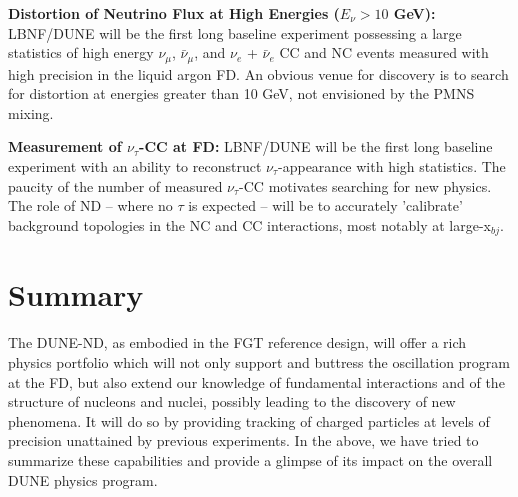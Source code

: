 \vspace{0.25cm} 
\noindent 
{\bf Distortion of Neutrino Flux at High Energies ($E_\nu > 10$ GeV):} 
LBNF/DUNE will be the first long baseline experiment possessing a large 
statistics of high energy $\nu_\mu$,  $\bar \nu_\mu$, and $\nu_e$ + $\bar \nu_e$ CC and NC events 
measured with high precision in the liquid argon FD. An obvious venue for discovery is to 
search for distortion at energies greater than 10 GeV, not envisioned by the 
PMNS mixing. 


\vspace{0.25cm} 
\noindent 
{\bf Measurement of $\nu_\tau$-CC at FD:} 
LBNF/DUNE will be the first long baseline experiment with an ability to 
reconstruct $\nu_\tau$-appearance with high statistics. The paucity of the number of measured 
$\nu_\tau$-CC motivates searching for new physics. 
The role of ND -- where no $\tau$ is expected -- will be to accurately 'calibrate' background topologies 
in the NC and CC interactions, most notably at large-x$_{bj}$. 


\section{Summary}
\label{sec:physics-nd-summary}

\noindent
The DUNE-ND, as embodied in the FGT reference design, will offer a rich physics portfolio which will not 
only support and buttress the oscillation program at the FD, but also extend our knowledge of fundamental interactions 
and of the structure of nucleons and nuclei, possibly leading to the discovery of new phenomena. It will do 
so by providing tracking of charged particles at levels of precision unattained by previous experiments.  
In the above, we have tried to summarize these capabilities and provide a glimpse of its 
impact on the overall DUNE physics program. 



%


